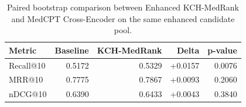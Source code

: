 \begin{table}[t]
\centering
\small
\caption{Paired bootstrap comparison between Enhanced KCH-MedRank and MedCPT Cross-Encoder on the same enhanced candidate pool.}
\label{tab:enhanced-bioasq-significance}
\begin{tabular}{lrrrr}
\toprule
Metric & Baseline & KCH-MedRank & Delta & p-value \\
\midrule
Recall@10 & 0.5172 & 0.5329 & +0.0157 & 0.0076 \\
MRR@10 & 0.7775 & 0.7867 & +0.0093 & 0.2060 \\
nDCG@10 & 0.6390 & 0.6433 & +0.0043 & 0.3840 \\
\bottomrule
\end{tabular}
\end{table}
